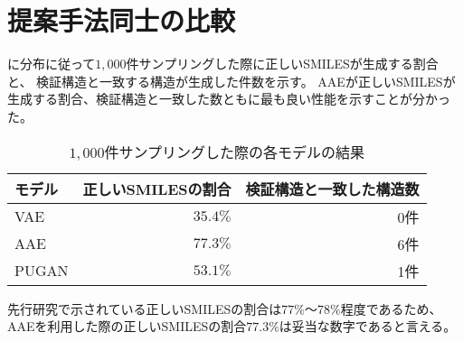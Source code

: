 \section{提案手法同士の比較} \label{sec:result_total}

に分布に従って$1,000$件サンプリングした際に正しいSMILESが生成する割合と、
検証構造と一致する構造が生成した件数を示す。
AAEが正しいSMILESが生成する割合、検証構造と一致した数ともに最も良い性能を示すことが分かった。
\begin{table}[tbp]
    \centering
    \caption{$1,000$件サンプリングした際の各モデルの結果} \label{tb:valid_structure_ratio}
    \begin{tabular}{lrr}\hline
    モデル & 正しいSMILESの割合 & 検証構造と一致した構造数 \\\hline
    VAE & $35.4\%$ & 0件 \\
    AAE & $77.3\%$ & 6件 \\
    PUGAN & $53.1\%$ & 1件 \\\hline
    \end{tabular}
\end{table}

先行研究\cite{Blaschke2018}で示されている正しいSMILESの割合は$77\%$〜$78\%$程度であるため、
AAEを利用した際の正しいSMILESの割合$77.3\%$は妥当な数字であると言える。

